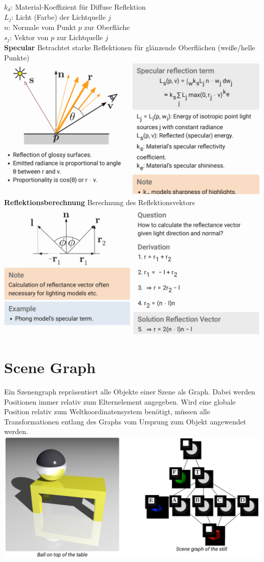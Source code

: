\documentclass[12pt]{article}
\begin{document}
	$k_d$: Material-Koeffizient für Diffuse Reflektion\\
	$L_j$: Licht (Farbe) der Lichtquelle $j$\\
	$n$: Normale vom Punkt $p$ zur Oberfläche\\
	$s_j$: Vektor von $p$ zur Lichtquelle $j$\\
	\textbf{Specular} Betrachtet starke Reflektionen für glänzende Oberflächen (weiße/helle Punkte)\\
	\includegraphics[width=\linewidth]{figures/phong-specular.png}\\
	\textbf{Reflektionsberechnung} Berechnung des Reflektionsvektors\\
	\includegraphics[width=\linewidth]{figures/reflektionsvektor.png}

	\section{Scene Graph}
	Ein Szenengraph repräsentiert alle Objekte einer Szene als Graph. Dabei werden Positionen immer relativ zum Elternelement angegeben. Wird eine globale Position relativ zum Weltkoordinatensystem benötigt, müssen alle Transformationen entlang des Graphs vom Ursprung zum Objekt angewendet werden.\\
	\includegraphics[width=\linewidth]{figures/scene-graph.png}
\end{document}
